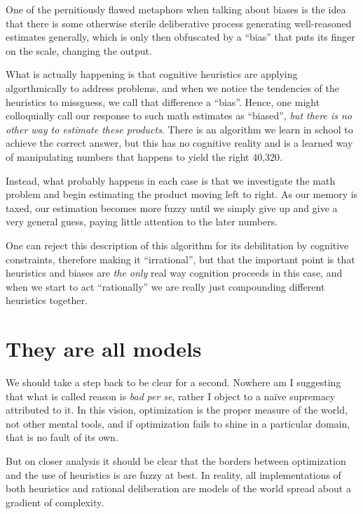 \documentclass{article}
\begin{document}
One of the pernitiously flawed metaphors when talking about biases is the idea that there is some otherwise sterile deliberative process generating well-reasoned estimates generally, which is only then obfuscated by a ``bias'' that puts its finger on the scale, changing the output.

What is actually happening is that cognitive heuristics are applying algorthmically to address problems, and when we notice the tendencies of the heuristics to missguess, we call that difference a ``bias''.
Hence, one might colloquially call our response to such math estimates as ``biased'', \emph{but there is no other way to estimate these products}.
There is an algorithm we learn in school to achieve the correct answer, but this has no cognitive reality and is a learned way of manipulating numbers that happens to yield the right 40,320.

Instead, what probably happens in each case is that we investigate the math problem and begin estimating the product moving left to right.
As our memory is taxed, our estimation becomes more fuzzy until we simply give up and give a very general guess, paying little attention to the later numbers.

One can reject this description of this algorithm for its debilitation by cognitive constraints, therefore making it ``irrational'', but that the important point is that heuristics and biases are \emph{the only} real way cognition proceeds in this case, and when we start to act ``rationally'' we are really just compounding different heuristics together.

\section{They are all models\label{models}}

We should take a step back to be clear for a second.
Nowhere am I suggesting that what is called reason is \emph{bad} \textit{per se}, rather I object to a na{\"i}ve supremacy attributed to it.
In this vision, optimization is the proper measure of the world, not other mental tools, and if optimization fails to shine in a particular domain, that is no fault of its own.

But on closer analysis it should be clear that the borders between optimization and the use of heuristics is are fuzzy at best.
In reality, all implementations of both heuristics and rational deliberation are models of the world spread about a gradient of complexity.
\end{document}

